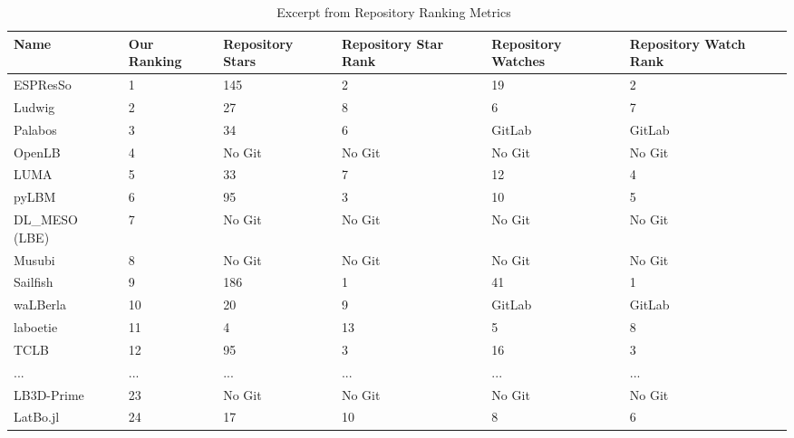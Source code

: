 \documentclass[runningheads]{llncs}
\begin{document}
\begin{table}[!h]
	\begin{center}
		\begin{tabular}{ p{3cm}p{1.25cm}p{1.75cm}p{1.75cm}p{1.75cm}p{1.75cm} }
			\toprule
			Name & Our Ranking & Repository Stars & Repository Star Rank &
			Repository Watches & Repository Watch Rank\\
			\midrule
			ESPResSo & 1 & 145 & 2 & 19& 2\\
			Ludwig & 2 & 27 & 8 & 6& 7\\
			Palabos & 3 & 34 & 6 & GitLab& GitLab\\
			OpenLB & 4 & No Git & No Git & No Git& No Git\\
			LUMA & 5 & 33 & 7 & 12& 4\\
			pyLBM & 6 & 95 & 3 & 10& 5\\
			DL\_MESO (LBE) & 7 & No Git & No Git & No Git & No Git\\
			Musubi & 8 & No Git & No Git & No Git & No Git\\
			Sailfish & 9 & 186 & 1 & 41& 1\\
			waLBerla & 10 & 20 & 9 & GitLab& GitLab\\
			laboetie & 11 & 4 & 13 & 5& 8\\
			TCLB & 12 & 95 & 3 & 16& 3\\
			... & ... & ... & ... & ... & ...\\	
			LB3D-Prime & 23 & No Git & No Git & No Git& No Git\\	
			LatBo.jl & 24 & 17 & 10 & 8& 6\\			
			\bottomrule
		\end{tabular}
		\caption{Excerpt from Repository Ranking Metrics~\cite{Michalski2021}}
		\label{repometrics}
	\end{center}
	\end{table}
\end{document}
